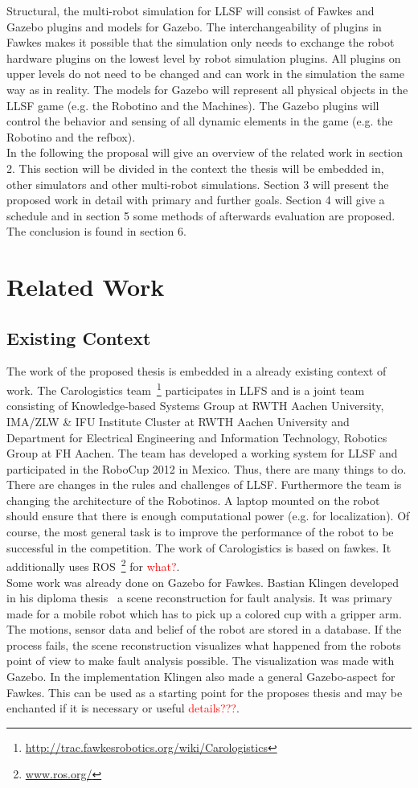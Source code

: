 \documentclass[11pt,a4paper,titlepage]{article}
\begin{document}
Structural, the multi-robot simulation for LLSF will consist of Fawkes and Gazebo plugins and models for Gazebo. The interchangeability of plugins in Fawkes makes it possible that the simulation only needs to exchange the robot hardware plugins on the lowest level by robot simulation plugins. All plugins on upper levels do not need to be changed and can work in the simulation the same way as in reality. The models for Gazebo will represent all physical objects in the LLSF game (e.g. the Robotino and the Machines). The Gazebo plugins will control the behavior and sensing of all dynamic elements in the game (e.g. the Robotino and the refbox).\\
In the following the proposal will give an overview of the related work in section 2. This section will be divided in the context the thesis will be embedded in, other simulators and other multi-robot simulations. Section 3 will present the proposed work in detail with primary and further goals. Section 4 will give a schedule and in section 5 some methods of afterwards evaluation are proposed. The conclusion is found in section 6.


\section{Related Work}
\subsection{Existing Context}
The work of the proposed thesis is embedded in a already existing context of work. The Carologistics team~\footnote{\url{http://trac.fawkesrobotics.org/wiki/Carologistics}} participates in LLFS and is a joint team consisting of Knowledge-based Systems Group at RWTH Aachen University, IMA/ZLW \& IFU Institute Cluster at RWTH Aachen University and Department for Electrical Engineering and Information Technology, Robotics Group at FH Aachen. The team has developed a working system for LLSF and participated in the RoboCup 2012 in Mexico. Thus, there are many things to do. There are changes in the rules and challenges of LLSF. Furthermore the team is changing the architecture of the Robotinos. A laptop mounted on the robot should ensure that there is enough computational power (e.g. for localization). Of course, the most general task is to improve the performance of the robot to be successful in the competition. The work of Carologistics is based on fawkes. It additionally uses ROS~\footnote{\url{www.ros.org/}} for \textcolor{red}{what?}.\\
Some work was already done on Gazebo for Fawkes. Bastian Klingen developed in his diploma thesis~\cite{KlingenDA} a scene reconstruction for fault analysis. It was primary made for a mobile robot which has to pick up a colored cup with a gripper arm. The motions, sensor data and belief of the robot are stored in a database. If the process fails, the scene reconstruction visualizes what happened from the robots point of view to make fault analysis possible. The visualization was made with Gazebo. In the implementation Klingen also made a general Gazebo-aspect for Fawkes. This can be used as a starting point for the proposes thesis and may be enchanted if it is necessary or useful \textcolor{red}{details???}.
\end{document}
